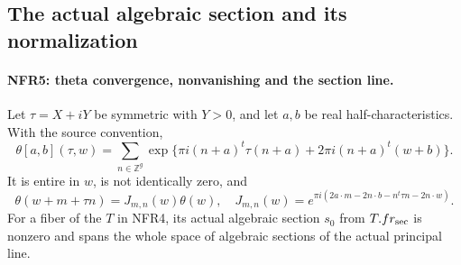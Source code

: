 \documentclass[11pt,a4paper]{article}
\numberwithin{equation}{section}
\theoremstyle{remark}\newtheorem{remark}[theorem]{Remark}
\begin{document}
\subsection{The actual algebraic section and its normalization}

\paragraph{NFR5: theta convergence, nonvanishing and the section line.}
\label{claim:NFR5}
Let $\tau=X+iY$ be symmetric with $Y>0$, and let $a,b$ be real
half-characteristics.  With the source convention,
\[
 \theta[a,b](\tau,w)=\sum_{n\in\mathbb Z^g}
   \exp\{\pi i(n+a)^t\tau(n+a)+2\pi i(n+a)^t(w+b)\}.
 \tag{NFR.11}
\]
It is entire in $w$, is not identically zero, and
\[
 \theta(w+m+\tau n)=J_{m,n}(w)\theta(w),\quad
 J_{m,n}(w)=e^{\pi i(2a\cdot m-2n\cdot b-n^t\tau n-2n\cdot w)}.
 \tag{NFR.12}
\]
For a fiber of the $T$ in NFR4, its actual algebraic section
$s_0$ from $T.fr_{\rm sec}$ is nonzero and spans the whole space
of algebraic sections of the actual principal line.
\end{document}
